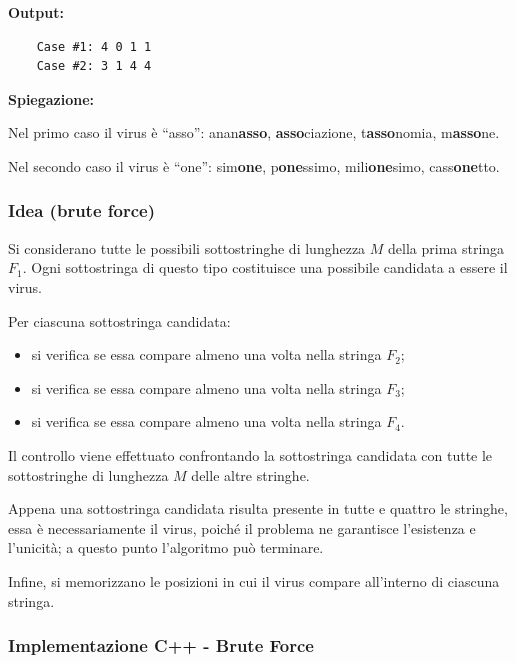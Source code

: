 \smallskip  
\textbf{Output:}  
\begin{verbatim}
	Case #1: 4 0 1 1
	Case #2: 3 1 4 4
\end{verbatim}

\noindent\textbf{Spiegazione:} 

Nel primo caso il virus è “asso”: anan\textbf{asso}, \textbf{asso}ciazione, t\textbf{asso}nomia, m\textbf{asso}ne.

Nel secondo caso il virus è “one”: sim\textbf{one}, p\textbf{one}ssimo, mili\textbf{one}simo, cass\textbf{one}tto.


\subsubsection*{Idea (brute force)}

Si considerano tutte le possibili sottostringhe di lunghezza \(M\) della prima stringa \(F_1\).
Ogni sottostringa di questo tipo costituisce una possibile candidata a essere il virus.

Per ciascuna sottostringa candidata:
\begin{itemize}
	\item si verifica se essa compare almeno una volta nella stringa \(F_2\);
	\item si verifica se essa compare almeno una volta nella stringa \(F_3\);
	\item si verifica se essa compare almeno una volta nella stringa \(F_4\).
\end{itemize}

Il controllo viene effettuato confrontando la sottostringa candidata con tutte le sottostringhe
di lunghezza \(M\) delle altre stringhe.

Appena una sottostringa candidata risulta presente in tutte e quattro le stringhe,
essa è necessariamente il virus, poiché il problema ne garantisce l’esistenza e l’unicità;
a questo punto l’algoritmo può terminare.

Infine, si memorizzano le posizioni in cui il virus compare all’interno di ciascuna stringa.

\subsubsection*{Implementazione C++ - Brute Force}


